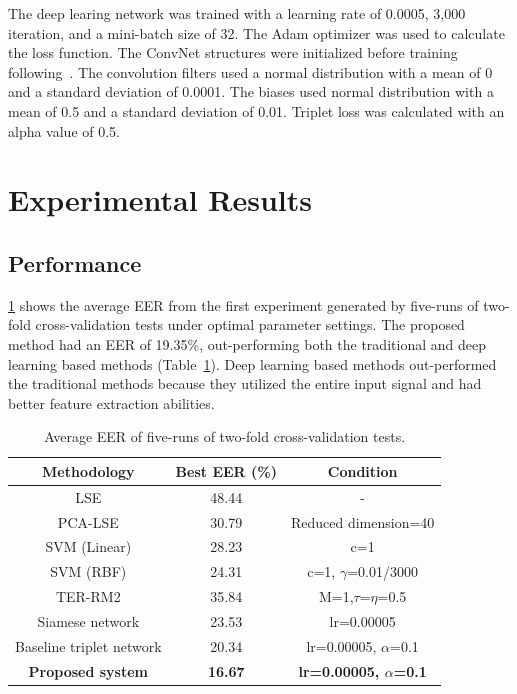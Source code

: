 The deep learing network was trained with a learning rate of 0.0005, 3,000 iteration, and a mini-batch size of 32. The Adam optimizer was used to calculate the loss function. The ConvNet structures were initialized before training following~\cite{koch2015siamese}. The convolution filters used a normal distribution with a mean of 0 and a standard deviation of 0.0001. The biases used normal distribution with a mean of 0.5 and a standard deviation of 0.01. Triplet loss was calculated with an alpha value of 0.5.

\section{Experimental Results}
\subsection{Performance}
\ref{tab_performance} shows the average EER from the first experiment generated by five-runs of two-fold cross-validation tests under optimal parameter settings. The proposed method had an EER of 19.35\%, out-performing both the traditional and deep learning based methods (Table~\ref{tab_performance}).
Deep learning based methods out-performed the traditional methods because they utilized the entire input signal and had better feature extraction abilities.
\begin{table}[!h]
    \caption{Average EER of five-runs of two-fold cross-validation tests.}\label{tab_performance}
    \centering
    \begin{tabular}{|c|c|c|}
    \hline
    Methodology   &   Best EER (\%) &   Condition   \\  \hline
    LSE &   48.44   &  - \\ 
    PCA-LSE    &   30.79   &  Reduced dimension=40    \\
    SVM (Linear) &   28.23   &   c=1 \\
    SVM (RBF)    &   24.31   &   c=1, $\gamma$=0.01/3000 \\
    TER-RM2 &   35.84   &  M=1,$\tau$=$\eta$=0.5   \\     \hline
    Siamese network  &   23.53   &   lr=0.00005  \\
    Baseline triplet network &   20.34   &   lr=0.00005, $\alpha$=0.1  \\
    \textbf{Proposed system} &   \textbf{16.67}   &  \textbf{lr=0.00005, $\alpha$=0.1}  \\
     \hline
    \end{tabular}
\end{table}

